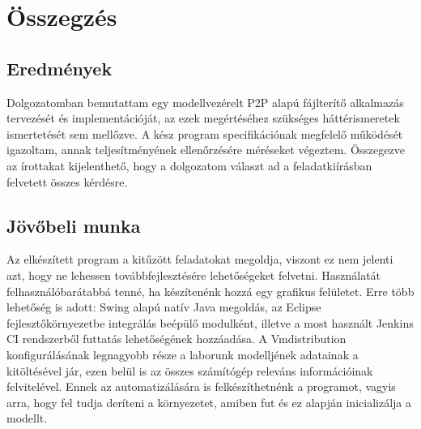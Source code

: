 \chapter{Összegzés}
\label{chp:summary}

\section{Eredmények}
Dolgozatomban bemutattam egy modellvezérelt P2P alapú fájlterítő alkalmazás tervezését és implementációját, az ezek megértéséhez szükséges háttérismeretek ismertetését sem mellőzve. A kész program specifikációnak megfelelő működését igazoltam, annak teljesítményének ellenőrzésére méréseket végeztem. Összegezve az írottakat kijelenthető, hogy a dolgozatom választ ad a feladatkiírásban felvetett összes kérdésre.

\section{Jövőbeli munka}
Az elkészített program a kitűzött feladatokat megoldja, viszont ez nem jelenti azt, hogy ne lehessen továbbfejlesztésére lehetőségeket felvetni.
Használatát felhasználóbarátabbá tenné, ha készítenénk hozzá egy grafikus felületet. Erre több lehetőség is adott: Swing\cite{zukowski2005definitive} alapú natív Java megoldás, az Eclipse fejlesztőkörnyezetbe integrálás beépülő modulként, illetve a most használt Jenkins CI rendszerből futtatás lehetőségének hozzáadása.
A Vmdistribution konfigurálásának legnagyobb része a laborunk modelljének adatainak a kitöltésével jár, ezen belül is az összes számítógép releváns információinak felvitelével. Ennek az automatizálására is felkészíthetnénk a programot, vagyis arra, hogy fel tudja deríteni a környezetet, amiben fut és ez alapján inicializálja a modellt.